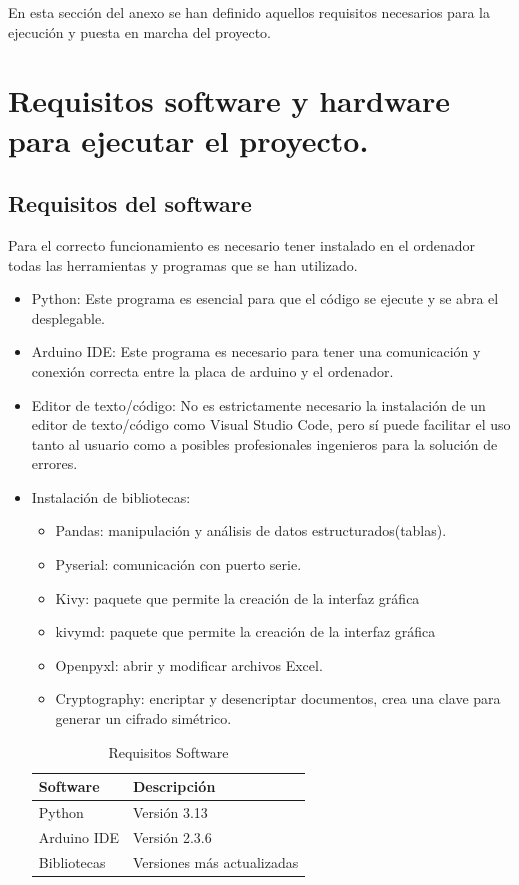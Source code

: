 En esta sección del anexo se han definido aquellos requisitos necesarios para la ejecución y puesta en marcha del proyecto. 
\section{Requisitos software y hardware para ejecutar el proyecto.}
\subsection{Requisitos del software}
Para el correcto funcionamiento es necesario tener instalado en el ordenador todas las herramientas y programas que se han utilizado. 
\begin{itemize}
    \item Python: Este programa es esencial para que el código se ejecute y se abra el desplegable.
    \item Arduino IDE: Este programa es necesario para tener una comunicación y conexión correcta entre la placa de arduino y el ordenador.
    \item Editor de texto/código: No es estrictamente necesario la instalación de un editor de texto/código como Visual Studio Code, pero sí puede facilitar el uso tanto al usuario como a posibles profesionales ingenieros para la solución de errores.
    \item Instalación de bibliotecas:
    \begin{itemize}
        \item Pandas: manipulación y análisis de datos estructurados(tablas).
        \item Pyserial: comunicación con puerto serie.
        \item Kivy: paquete que permite la creación de la interfaz gráfica
        \item kivymd: paquete que permite la creación de la interfaz gráfica
        \item Openpyxl: abrir y modificar archivos Excel.
        \item Cryptography: encriptar y desencriptar documentos, crea una clave para generar un cifrado simétrico.
    \end{itemize}

\begin{table}[]
\centering
\begin{tabular}{|l|l|}
\hline
\rowcolor[HTML]{BFBFBF} 
\textbf{Software} & \textbf{Descripción} \\ \hline
Python & Versión 3.13\\ \hline
Arduino IDE & Versión 2.3.6\\ \hline
Bibliotecas & Versiones más actualizadas\\ \hline
\end{tabular}
\caption{Requisitos Software}
\label{tab:Requisitos_Software}
\end{table}
\end{itemize}
